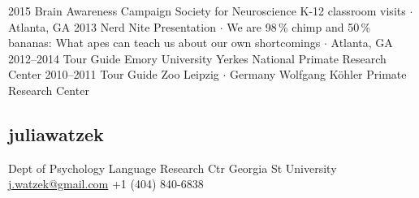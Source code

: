 \documentclass[]{friggeri-cv}
\begin{document}
\begin{entrylist}
  \entry
    {2015}
    {Brain Awareness Campaign}
    {Society for Neuroscience}
    {K-12 classroom visits $\cdot$ Atlanta, GA}
  \entry
    {2013}
    {Nerd Nite}
    {}
    {Presentation $\cdot$ We are 98\,\% chimp and 50\,\% bananas: What apes can teach us about our own shortcomings $\cdot$ Atlanta, GA}
  \entry
    {2012--2014}
    {Tour Guide}
    {Emory University}
    {Yerkes National Primate Research Center}
  \entry
    {2010--2011}
    {Tour Guide}
    {Zoo Leipzig $\cdot$ Germany}
    {Wolfgang K\"{o}hler Primate Research Center}
\end{entrylist}

\begin{aside}
  \section{{\normalfont julia}watzek}
    Dept of Psychology
    Language Research Ctr
    Georgia St University
    ~
    \href{mailto:j.watzek@gmail.com}{j.watzek@gmail.com}
    +1 (404) 840-6838
\end{aside}
\end{document}
